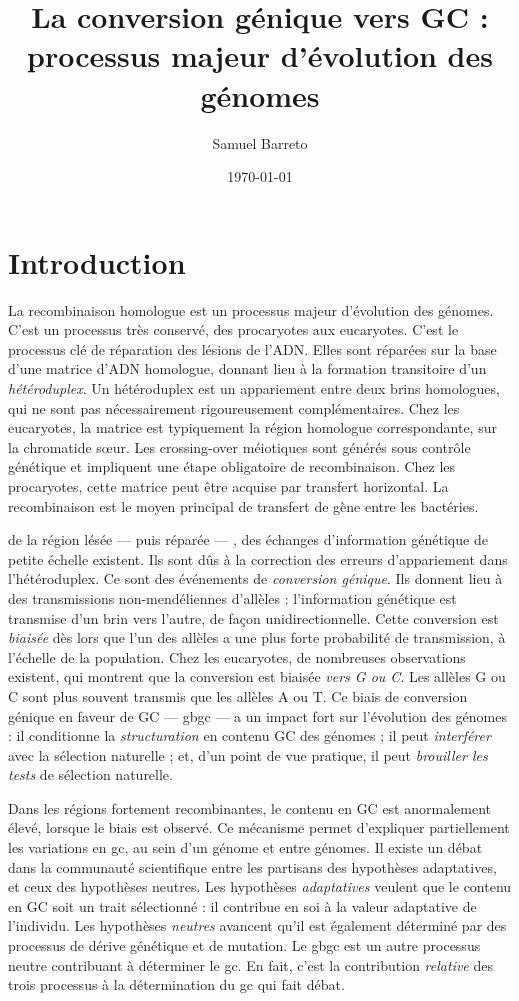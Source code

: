 \documentclass[11pt, oneside]{scrartcl}
\author{Samuel Barreto}
\date{\today}
\title{La conversion génique vers GC : processus majeur d'évolution des génomes}
\begin{document}


\section*{Introduction}
\label{sec:orgheadline1}
La recombinaison homologue est un processus majeur d'évolution des génomes.
C'est un processus très conservé, des procaryotes aux eucaryotes\cite{cromie_recombination_2001}. C'est le
processus clé de réparation des lésions de l'ADN. Elles sont réparées sur la
base d'une matrice d'ADN homologue, donnant lieu à la formation transitoire d'un
\emph{hétéroduplex}. Un hétéroduplex est un appariement entre deux brins homologues,
qui ne sont pas nécessairement rigoureusement complémentaires. Chez les
eucaryotes, la matrice est typiquement la région homologue correspondante, sur
la chromatide sœur. Les crossing-over méiotiques sont générés sous contrôle
génétique et impliquent une étape obligatoire de recombinaison\cite{mancera_high-resolution_2008}. Chez les
procaryotes, cette matrice peut être acquise par transfert horizontal. La
recombinaison est le moyen principal de transfert de gène entre les bactéries\cite{vos_rates_2015}.

 de la région lésée --- puis réparée --- , des échanges
d'information génétique de petite échelle existent\cite{duret_biased_2009}. Ils
sont dûs à la correction des erreurs d'appariement dans l'hétéroduplex. Ce sont
des événements de \emph{conversion génique}. Ils donnent lieu à des transmissions
non-mendéliennes d'allèles : l'information génétique est transmise d'un brin
vers l'autre, de façon unidirectionnelle. Cette conversion est \emph{biaisée} dès
lors que l'un des allèles a une plus forte probabilité de transmission, à
l'échelle de la population. Chez les eucaryotes, de nombreuses observations
existent, qui montrent que la conversion est biaisée \emph{vers G ou
C}\cite{pessia_evidence_2012, mancera_high-resolution_2008}. Les allèles G ou C
sont plus souvent transmis que les allèles A ou T. Ce biais de conversion
génique en faveur de GC --- \ac{gbgc} --- a un impact fort sur l'évolution des
génomes : il conditionne la \emph{structuration} en contenu GC des génomes ; il peut
\emph{interférer} avec la sélection naturelle ; et, d'un point de vue pratique, il
peut \emph{brouiller les tests} de sélection naturelle\cite{duret_biased_2009}.

Dans les régions fortement recombinantes, le contenu en GC est anormalement
élevé, lorsque le biais est observé\cite{duret_impact_2008}. Ce mécanisme permet
d'expliquer partiellement les variations en \ac{gc}, au sein d'un génome et
entre génomes. Il existe un débat dans la communauté scientifique entre les
partisans des hypothèses adaptatives, et ceux des hypothèses neutres. Les
hypothèses \emph{adaptatives} veulent que le contenu en GC soit un trait
sélectionné : il contribue en soi à la valeur adaptative de
l'individu\cite{hildebrand_evidence_2010}. Les hypothèses \emph{neutres} avancent
qu'il est également déterminé par des processus de dérive génétique et de
mutation. Le \ac{gbgc} est un autre processus neutre contribuant à déterminer le
\ac{gc}. En fait, c'est la contribution \emph{relative} des trois processus à la
détermination du \ac{gc} qui fait débat.
\end{document}
